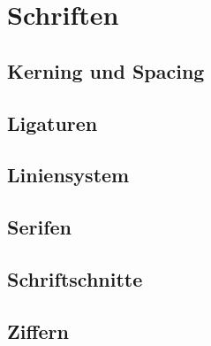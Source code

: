 \chapter{Schriften}
\label{ch:Schriften}

\section{Kerning und Spacing}
\label{sec:KernSpace}

\section{Ligaturen}

\section{Liniensystem}

\section{Serifen}

\section{Schriftschnitte}
\label{sec:Schnitte}

\section{Ziffern}
\label{sec:Ziffern}


